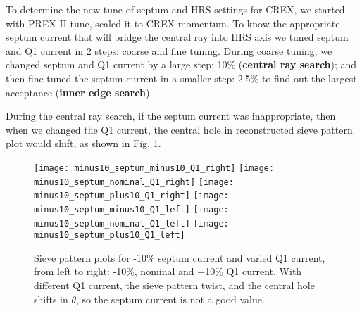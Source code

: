 \begin{comment}
    PREX tune B: p7 in https://prex.jlab.org/DocDB/0001/000112/001/OpticsCalc.pdf
    \begin{equation}
	\begin{pmatrix}
	    x_{fp}  \\
	    \theta_{fp}  \\
	    y_{fp}  \\
	    \phi_{fp}  \\
	    \delta_{fp}  \\
	\end{pmatrix}
	=
	\begin{pmatrix}
	    -3.09   & -0.02 & 0	& 0 & 16.73 \\
	    -0.31   & -0.32 & 0	& 0 & 2.5   \\
	    0	& 0 & 2.11  & 0.01  & -0.48 \\
	    0	& 0 & 1.1   & 0.48  & -0.19 \\
	    0	& 0 & 0	& 0 & 1	\\
	\end{pmatrix}
	\begin{pmatrix}
	    x_{tg}  \\
	    \theta_{tg}  \\
	    y_{tg}  \\
	    \phi_{tg}  \\
	    \delta_{tg}  \\
	\end{pmatrix}
    \end{equation}
\end{comment}

To determine the new tune of septum and HRS settings for CREX, we started with 
PREX-II tune, scaled it to CREX momentum. To know the appropriate septum 
current that will bridge the central ray into HRS axis we tuned septum and 
Q1 current in 2 steps: coarse and fine tuning. During coarse tuning, we
changed septum and Q1 current by a large step: 10\% (\textbf{central ray search});
and then fine tuned the septum current in a smaller step: 2.5\% to find out
the largest acceptance (\textbf{inner edge search}).

During the central ray search, if the septum current was inappropriate, 
then when we changed the Q1 current, the central hole in reconstructed sieve 
pattern plot would shift, as shown in Fig. \ref{fig:central_ray_0}.
\begin{figure}[H]
    \centering
    \texttt{[image: minus10\_septum\_minus10\_Q1\_right]}
    \texttt{[image: minus10\_septum\_nominal\_Q1\_right]}
    \texttt{[image: minus10\_septum\_plus10\_Q1\_right]}
    \texttt{[image: minus10\_septum\_minus10\_Q1\_left]}
    \texttt{[image: minus10\_septum\_nominal\_Q1\_left]}
    \texttt{[image: minus10\_septum\_plus10\_Q1\_left]}
    \caption{Sieve pattern plots for -10\% septum current
    and varied Q1 current, from left to right: -10\%, nominal and +10\% Q1 current.
    With different Q1 current, the sieve pattern twist, and the central hole 
    shifts in $\theta$, so the septum current is not a good value.}
    \label{fig:central_ray_0}
\end{figure}

